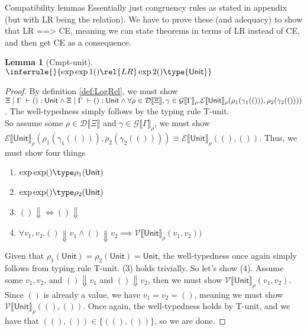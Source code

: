 \documentclass[twoside,11pt,openright]{report}
\newtheorem{lemma}[theorem]{Lemma}
\theoremstyle{definition}
\newcommand{\val}{v}
\newcommand{\TT}{()}
\newcommand{\Tunit}{\mathsf{Unit}}
\newcommand{\venv}{\Gamma}
\newcommand{\tenv}{\Xi}
\newcommand{\empvenv}{\bullet}
\newcommand{\emptenv}{\bullet}
\newcommand{\jdg}[4]{#1 \; | \; #2 \; \vdash #3 : #4}
\def\envs#1#2\exp#3\type#4{\jdg{#1}{#2}{#3}{#4}} %
\def\envsrel#1#2\exp1#3 \rel#4 \exp2#5\type#6
\newcommand{\ValInp}[2]{\mathcal{V} \llbracket #1 \rrbracket_{#2}}
\newcommand{\ValInpGen}[2]{\ValInp{#1}{#2}(\val_1, \val_2)}
\newcommand{\ExpInp}[2]{\mathcal{E} \llbracket #1 \rrbracket_{#2}}
\newcommand{\VenvInp}[2]{\mathcal{G} \llbracket #1 \rrbracket_{#2}}
\newcommand{\TenvInp}[1]{\mathcal{D} \llbracket #1 \rrbracket}
\begin{document}
Compatibility lemmas
Essentially just congruency rules as stated in appendix (but with LR being the relation). We have to prove these (and adequacy) to show that LR ==> CE, meaning we can state theorems in terms of LR instead of CE, and then get CE as a consequence.
\begin{lemma}[Cmpt-unit]
  $\inferrule{ }{ \envsrel \tenv \venv \exp1 {\TT} \rel {LR} \exp2 {\TT} \type {\Tunit} }$
\end{lemma}
\begin{proof}
  By definition \ref*{def:LogRel}, we must show $\jdg{\tenv}{\venv}{\TT}{\Tunit} \land \jdg{\tenv}{\venv}{\TT}{\Tunit} \land\\ \forall \rho \in \TenvInp{\tenv}, \gamma \in \VenvInp{\venv}{\rho} . 
  \ExpInp{\Tunit}{\rho}(\rho_1(\gamma_1(\TT)), \rho_2(\gamma_2(\TT)))$. The well-typedness simply follows by the typing rule T-unit.\\
  So assume some $\rho \in \TenvInp{\tenv}$ and $\gamma \in \VenvInp{\venv}{\rho}$, we must show\\ $\ExpInp{\Tunit}{\rho}(\rho_1(\gamma_1(\TT)), \rho_2(\gamma_2(\TT))) \equiv \ExpInp{\Tunit}{\rho}(\TT, \TT)$. Thus, we must show four things
  \begin{enumerate}
    \item $\envs \emptenv \empvenv \exp \TT \type \rho_1(\Tunit)$
    \item $\envs \emptenv \empvenv \exp \TT \type \rho_2(\Tunit)$
    \item $\TT \Downarrow \iff \TT \Downarrow$
    \item $\forall \val_1, \val_2 . \TT \Downarrow \val_1 \land \TT \Downarrow \val_2 \implies \ValInpGen{\Tunit}{\rho})$
  \end{enumerate}
  Given that $\rho_1(\Tunit) = \rho_2(\Tunit) = \Tunit$, the well-typedness once again simply follows from typing rule T-unit. (3) holds trivially. So let's show (4). Assume some $\val_1, \val_2$, and $\TT \Downarrow \val_1$ and $\TT \Downarrow \val_2$, then we must show $\ValInpGen{\Tunit}{\rho}$. Since $\TT$ is already a value, we have $\val_1 = \val_2 = \TT$, meaning we must show $\ValInp{\Tunit}{\rho}(\TT, \TT)$. Once again, the well-typedness holds by T-unit, and we have that $(\TT, \TT) \in \{(\TT, \TT)\}$, so we are done.
\end{proof}
\end{document}
